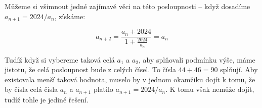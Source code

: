 \documentclass{fkssolpub}
\author{Ondřej Sedláček}
\begin{document}
 

Můžeme si všimnout jedné zajímavé věci na této posloupnosti -- když
dosadíme $a_{n+1} = 2024 / a_n$, získáme:

\[
  a_{n+2} = \frac{a_n + 2024}{1 + \frac{2024}{a_n}} = a_n
\]

Tudíž když si vybereme taková celá $a_1$ a $a_2$, aby splňovali
podmínku výše, máme jistotu, že celá posloupnost bude z celých čísel.
To čísla $44 + 46 = 90$ splňují. Aby existovala menší taková hodnota,
muselo by v jednom okamžiku dojít k tomu, že by čísla celá čísla
$a_{n}$ a $a_{n+1}$ platilo $a_{n+1} = 2024 / a_n$. K tomu však nemůže
dojít, tudíž tohle je jediné řešení.
\end{document}
